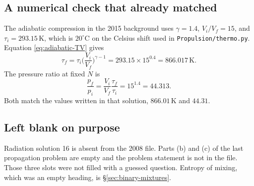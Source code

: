 \subsection{A numerical check that already matched}
\label{sec:checked-numbers}

The adiabatic compression in the 2015 background uses \(\gamma = 1.4\), \(V_i/V_f = 15\), and \(\tau_i = 293.15\,\mathrm{K}\), which is \(20^{\circ}\mathrm{C}\) on the Celsius shift used in \texttt{Propulsion/thermo.py}. Equation \eqref{eq:adiabatic-TV} gives
\begin{equation}
\label{eq:diesel}
\tau_f = \tau_i \biggl(\frac{V_i}{V_f}\biggr)^{\gamma-1}
= 293.15 \times 15^{0.4}
= 866.017\,\mathrm{K}.
\end{equation}
The pressure ratio at fixed \(N\) is
\begin{equation}
\label{eq:diesel-p}
\frac{p_f}{p_i}
= \frac{V_i}{V_f}\frac{\tau_f}{\tau_i}
= 15^{1.4}
= 44.313.
\end{equation}
Both match the values written in that solution, \(866.01\,\mathrm{K}\) and \(44.31\).

\subsection{Left blank on purpose}

Radiation solution 16 is absent from the 2008 file. Parts (b) and (c) of the last propagation problem are empty and the problem statement is not in the file. Those three slots were not filled with a guessed question. Entropy of mixing, which was an empty heading, is \S\ref{sec:binary-mixtures}.
